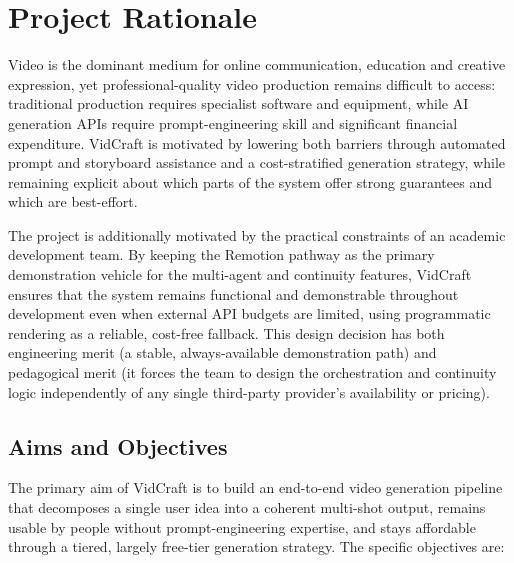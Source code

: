 \documentclass[11pt,a4paper]{article}
\begin{document}
\needspace{0.5\textheight}
\section{Project Rationale}

Video is the dominant medium for online communication, education and creative expression, yet professional-quality video production remains difficult to access: traditional production requires specialist software and equipment, while AI generation APIs require prompt-engineering skill and significant financial expenditure. VidCraft is motivated by lowering both barriers through automated prompt and storyboard assistance and a cost-stratified generation strategy, while remaining explicit about which parts of the system offer strong guarantees and which are best-effort.

The project is additionally motivated by the practical constraints of an academic development team. By keeping the Remotion pathway as the primary demonstration vehicle for the multi-agent and continuity features, VidCraft ensures that the system remains functional and demonstrable throughout development even when external API budgets are limited, using programmatic rendering as a reliable, cost-free fallback. This design decision has both engineering merit (a stable, always-available demonstration path) and pedagogical merit (it forces the team to design the orchestration and continuity logic independently of any single third-party provider's availability or pricing).

\subsection{Aims and Objectives}

The primary aim of VidCraft is to build an end-to-end video generation pipeline that decomposes a single user idea into a coherent multi-shot output, remains usable by people without prompt-engineering expertise, and stays affordable through a tiered, largely free-tier generation strategy. The specific objectives are:
\end{document}
